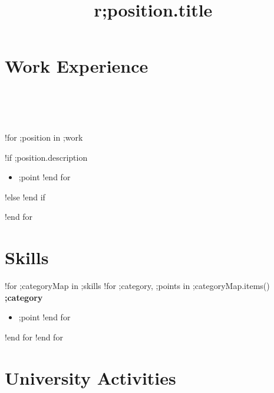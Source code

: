 \documentclass[margin,line]{res}
\begin{document}
\begin{sloppypar} %

\address{;contact.github\hspace{1cm};contact.phone\hspace{1cm};contact.email}

\begin{resume}

\section {Work Experience}

\begin{format}
  \title{r}\\
  \\
  \body\\
\end{format}

!for ;position in ;work
    \title{;position.title}
    \begin{position}
        \vspace{-.3cm}
        !if ;position.description
            \begin{itemize}
            !for ;point in ;position.description
                \item ;point
            !end for
            \end{itemize}
        !else
            \vspace{-.2cm}
        !end if
    \end{position}
!end for


\section{Skills}
!for ;categoryMap in ;skills
    !for ;category, ;points in ;categoryMap.items()
        {\bf ;category}
        \begin{itemize}
        !for ;point in ;points
            \item ;point
        !end for
        \end{itemize}
    !end for
!end for


\section {University Activities}


\end{resume}
\end{sloppypar}
\end{document}
